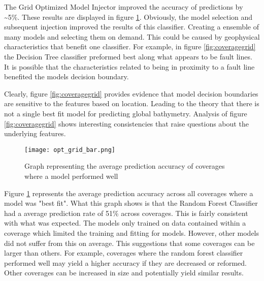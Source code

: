\par
The Grid Optimized Model Injector improved the accuracy of predictions by \~{}5\%.
These results are displayed in figure \ref{fig:grid_opt_graph}.
Obviously, the model selection and subsequent injection improved the results of this classifier.
Creating a ensemble of many models and selecting them on demand.
This could be caused by geophysical characteristics that benefit one classifier.
For example, in figure \ref{fig:coveragegrid} the Decision Tree classifier preformed best along what appears to be fault lines.
It is possible that the characteristics related to being in proximity to a fault line benefited the models decision boundary. 

\par
Clearly, figure \ref{fig:coveragegrid} provides evidence that model decision boundaries are sensitive to the features based on location.
Leading to the theory that there is not a single best fit model for predicting global bathymetry.
Analysis of figure \ref{fig:coveragegrid} shows interesting consistencies that raise questions about the underlying features.

\begin{figure}[h]
    \centering
    \texttt{[image: opt\_grid\_bar.png]}
    \caption{Graph representing the average prediction accuracy of coverages where a model performed well}
    \label{fig:grid_opt_graph}
\end{figure}

\par
Figure \ref{fig:grid_opt_graph} represents the average prediction accuracy across all coverages where a model was "best fit".
What this graph shows is that the Random Forest Classifier had a average prediction rate of 51\% across coverages.
This is fairly consistent with what was expected. 
The models only trained on data contained within a coverage which limited the training and fitting for models. 
However, other models did not suffer from this on average.
This suggestions that some coverages can be larger than others.
For example, coverages where the random forest classifier performed well may yield a higher accuracy if they are decreased or reformed.
Other coverages can be increased in size and potentially yield similar results.

